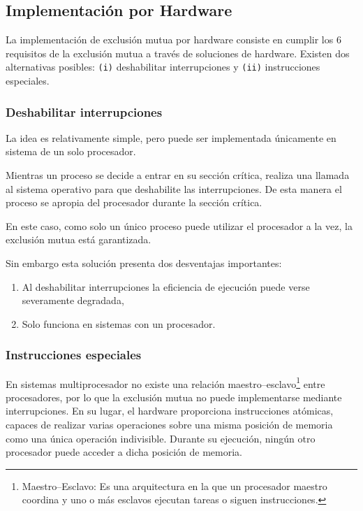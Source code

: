 \subsection{Implementación por Hardware}

La implementación de exclusión mutua por hardware consiste en cumplir los 6 requisitos de la exclusión mutua a través de soluciones de hardware. Existen dos alternativas posibles: \texttt{(i)} deshabilitar interrupciones y \texttt{(ii)} instrucciones especiales.

\subsubsection{Deshabilitar interrupciones}

La idea es relativamente simple, pero puede ser implementada únicamente en sistema de un solo procesador. 

Mientras un proceso se decide a entrar en su sección crítica, realiza una llamada al sistema operativo para que deshabilite las interrupciones. De esta manera el proceso se apropia del procesador durante la sección crítica. 

En este caso, como solo un único proceso puede utilizar el procesador a la vez, la exclusión mutua está garantizada.

Sin embargo esta solución presenta dos desventajas importantes: 
\begin{enumerate}
  \item Al deshabilitar interrupciones la eficiencia de ejecución puede verse severamente degradada,
  \item Solo funciona en sistemas con un procesador.
\end{enumerate}

\subsubsection{Instrucciones especiales}

En sistemas multiprocesador no existe una relación maestro--esclavo\footnote{Maestro--Esclavo: Es una arquitectura en la que un procesador maestro coordina y uno o más esclavos ejecutan tareas o siguen instrucciones.} entre procesadores, por lo que la exclusión mutua no puede implementarse mediante interrupciones. En su lugar, el hardware proporciona instrucciones atómicas, capaces de realizar varias operaciones sobre una misma posición de memoria como una única operación indivisible. Durante su ejecución, ningún otro procesador puede acceder a dicha posición de memoria.

